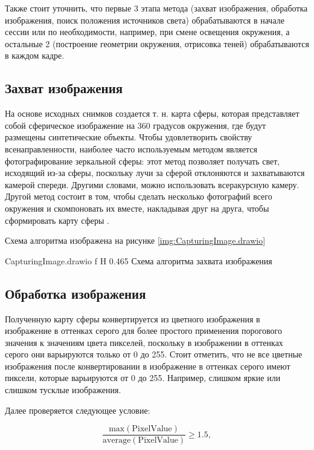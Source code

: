Также стоит уточнить, что первые 3 этапа метода (захват изображения, обработка изображения, поиск положения источников света) обрабатываются в начале сессии или по необходимости, например, при смене освещения окружения, а остальные 2 (построение геометрии окружения, отрисовка теней) обрабатываются в каждом кадре.

\subsection{Захват изображения}

На основе исходных снимков создается т. н. карта сферы, которая представляет собой сферическое изображение на 360 градусов окружения, где будут размещены синтетические объекты. Чтобы удовлетворить свойству всенаправленности, наиболее часто используемым методом является фотографирование зеркальной сферы: этот метод позволяет получать свет, исходящий из-за сферы, поскольку лучи за сферой отклоняются и захватываются камерой спереди. Другими словами, можно использовать всеракурсную камеру. Другой метод состоит в том, чтобы сделать несколько фотографий всего окружения и скомпоновать их вместе, накладывая друг на друга, чтобы сформировать карту сферы \cite{osti2019real}.

Схема алгоритма изображена на рисунке \ref{img:CapturingImage.drawio}

{CapturingImage.drawio}
{f}
{H}
{0.465\textwidth}
{Схема алгоритма захвата изображения}

\subsection{Обработка изображения}

Полученную карту сферы конвертируется из цветного изображения в изображение в оттенках серого для более простого применения порогового значения к значениям цвета пикселей, поскольку в изображении в оттенках серого они варьируются только от 0 до 255. Стоит отметить, что не все цветные изображения после конвертировании в изображение в оттенках серого имеют пиксели, которые варьируются от 0 до 255. Например, слишком яркие или слишком тусклые изображения.

Далее проверяется следующее условие:

\begin{equation}
	\frac{\text{max}(\text{PixelValue})}{\text{average}(\text{PixelValue})} \geq 1.5,
\end{equation}

